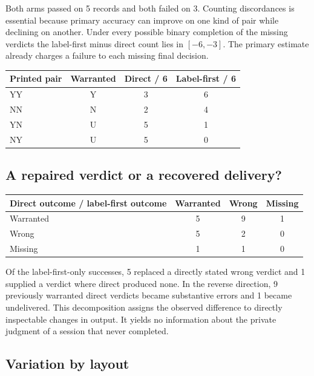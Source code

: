 \documentclass[12pt,letterpaper]{article}
\begin{document}
Both arms passed on 5 records and both failed on 3. Counting discordances is essential because primary accuracy can improve on one kind of pair while declining on another. Under every possible binary completion of the missing verdicts the label-first minus direct count lies in $[-6,-3]$. The primary estimate already charges a failure to each missing final decision.

\begin{center}{\small\setlength{\tabcolsep}{4pt}\begin{tabularx}{\linewidth}{@{}Yccc@{}}\toprule
Printed pair & Warranted & Direct / 6 & Label-first / 6\\ \midrule
YY & Y & 3 & 6\\
NN & N & 2 & 4\\
YN & U & 5 & 1\\
NY & U & 5 & 0\\
\bottomrule\end{tabularx}}\end{center}

\subsection{A repaired verdict or a recovered delivery?}

\begin{center}{\small\setlength{\tabcolsep}{4pt}\begin{tabularx}{\linewidth}{@{}Yccc@{}}\toprule
Direct outcome / label-first outcome & Warranted & Wrong & Missing\\ \midrule
Warranted & 5 & 9 & 1\\
Wrong & 5 & 2 & 0\\
Missing & 1 & 1 & 0\\
\bottomrule\end{tabularx}}\end{center}

Of the label-first-only successes, 5 replaced a directly stated wrong verdict and 1 supplied a verdict where direct produced none. In the reverse direction, 9 previously warranted direct verdicts became substantive errors and 1 became undelivered. This decomposition assigns the observed difference to directly inspectable changes in output. It yields no information about the private judgment of a session that never completed.

\subsection{Variation by layout}
\end{document}
